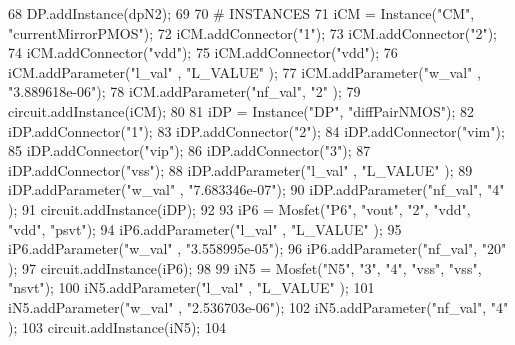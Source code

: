 \begin{DoxyCodeInclude}
68 DP.addInstance(dpN2);
69 
70 \textcolor{comment}{# INSTANCES}
71 iCM = Instance(\textcolor{stringliteral}{"CM"}, \textcolor{stringliteral}{"currentMirrorPMOS"});
72 iCM.addConnector(\textcolor{stringliteral}{"1"});
73 iCM.addConnector(\textcolor{stringliteral}{"2"});
74 iCM.addConnector(\textcolor{stringliteral}{"vdd"});
75 iCM.addConnector(\textcolor{stringliteral}{"vdd"});
76 iCM.addParameter(\textcolor{stringliteral}{"l\_val"} , \textcolor{stringliteral}{"L\_VALUE"}     );
77 iCM.addParameter(\textcolor{stringliteral}{"w\_val"} , \textcolor{stringliteral}{"3.889618e-06"});
78 iCM.addParameter(\textcolor{stringliteral}{"nf\_val"}, \textcolor{stringliteral}{"2"}           );
79 circuit.addInstance(iCM);
80 
81 iDP = Instance(\textcolor{stringliteral}{"DP"}, \textcolor{stringliteral}{"diffPairNMOS"});
82 iDP.addConnector(\textcolor{stringliteral}{"1"});
83 iDP.addConnector(\textcolor{stringliteral}{"2"});
84 iDP.addConnector(\textcolor{stringliteral}{"vim"});
85 iDP.addConnector(\textcolor{stringliteral}{"vip"});
86 iDP.addConnector(\textcolor{stringliteral}{"3"});
87 iDP.addConnector(\textcolor{stringliteral}{"vss"});
88 iDP.addParameter(\textcolor{stringliteral}{"l\_val"} , \textcolor{stringliteral}{"L\_VALUE"}     );
89 iDP.addParameter(\textcolor{stringliteral}{"w\_val"} , \textcolor{stringliteral}{"7.683346e-07"});
90 iDP.addParameter(\textcolor{stringliteral}{"nf\_val"}, \textcolor{stringliteral}{"4"}           );
91 circuit.addInstance(iDP);
92 
93 iP6 = Mosfet(\textcolor{stringliteral}{"P6"}, \textcolor{stringliteral}{"vout"}, \textcolor{stringliteral}{"2"}, \textcolor{stringliteral}{"vdd"}, \textcolor{stringliteral}{"vdd"}, \textcolor{stringliteral}{"psvt"});
94 iP6.addParameter(\textcolor{stringliteral}{"l\_val"} , \textcolor{stringliteral}{"L\_VALUE"}     );
95 iP6.addParameter(\textcolor{stringliteral}{"w\_val"} , \textcolor{stringliteral}{"3.558995e-05"});
96 iP6.addParameter(\textcolor{stringliteral}{"nf\_val"}, \textcolor{stringliteral}{"20"}          );
97 circuit.addInstance(iP6);
98 
99 iN5 = Mosfet(\textcolor{stringliteral}{"N5"}, \textcolor{stringliteral}{"3"}, \textcolor{stringliteral}{"4"}, \textcolor{stringliteral}{"vss"}, \textcolor{stringliteral}{"vss"}, \textcolor{stringliteral}{"nsvt"});
100 iN5.addParameter(\textcolor{stringliteral}{"l\_val"} , \textcolor{stringliteral}{"L\_VALUE"}     );
101 iN5.addParameter(\textcolor{stringliteral}{"w\_val"} , \textcolor{stringliteral}{"2.536703e-06"});
102 iN5.addParameter(\textcolor{stringliteral}{"nf\_val"}, \textcolor{stringliteral}{"4"}           );
103 circuit.addInstance(iN5);
104 

\end{DoxyCodeInclude}
